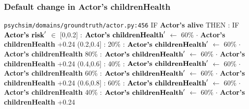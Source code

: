 \documentclass{article}%
\begin{document}
\subsubsection{Default change in Actor's childrenHealth}%
\label{ssubsec:Default change in Actor's childrenHealth}%
\begin{flushleft}%
\verb|psychsim/domains/groundtruth/actor.py:456|%
\linebreak%
IF %
\textbf{Actor's alive}%
\linebreak%
\hspace*{2em}%
THEN %
: %
IF %
$\mbox{\textbf{Actor's risk}} '$%
$\in$%
\linebreak%
\hspace*{4em}%
{[}0,0.2{]}%
: %
$\mbox{\textbf{Actor's childrenHealth}} '$%
$\leftarrow$%
60\%%
$\cdot$%
\textbf{Actor's childrenHealth}%
+0.24%
\linebreak%
\hspace*{4em}%
(0.2,0.4{]}%
: %
\linebreak%
\hspace*{6em}%
20\%%
: %
$\mbox{\textbf{Actor's childrenHealth}} '$%
$\leftarrow$%
60\%%
$\cdot$%
\textbf{Actor's childrenHealth}%
\linebreak%
\hspace*{6em}%
80\%%
: %
$\mbox{\textbf{Actor's childrenHealth}} '$%
$\leftarrow$%
60\%%
$\cdot$%
\textbf{Actor's childrenHealth}%
+0.24%
\linebreak%
\hspace*{4em}%
(0.4,0.6{]}%
: %
\linebreak%
\hspace*{6em}%
40\%%
: %
$\mbox{\textbf{Actor's childrenHealth}} '$%
$\leftarrow$%
60\%%
$\cdot$%
\textbf{Actor's childrenHealth}%
\linebreak%
\hspace*{6em}%
60\%%
: %
$\mbox{\textbf{Actor's childrenHealth}} '$%
$\leftarrow$%
60\%%
$\cdot$%
\textbf{Actor's childrenHealth}%
+0.24%
\linebreak%
\hspace*{4em}%
(0.6,0.8{]}%
: %
\linebreak%
\hspace*{6em}%
60\%%
: %
$\mbox{\textbf{Actor's childrenHealth}} '$%
$\leftarrow$%
60\%%
$\cdot$%
\textbf{Actor's childrenHealth}%
\linebreak%
\hspace*{6em}%
40\%%
: %
$\mbox{\textbf{Actor's childrenHealth}} '$%
$\leftarrow$%
60\%%
$\cdot$%
\textbf{Actor's childrenHealth}%
+0.24%
\linebreak%

\end{flushleft}
\end{document}
